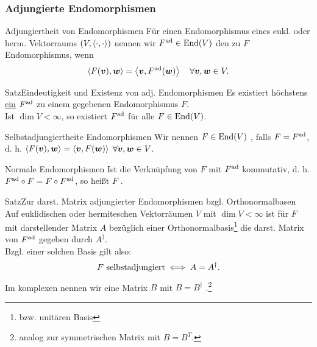\subsubsection{Adjungierte Endomorphismen}
\begin{Def}
{Adjungiertheit von Endomorphismen}
Für einen Endomorphismus eines eukl. oder herm. Vektorraums $(V,\left\langle\cdot,\cdot\right\rangle)$ nennen wir $F^{\text{ad}}\in \text{End}(V)$ den zu $F$  Endomorphismus, wenn
\begin{equation}
    \left\langle F({{\text{\boldmath${v}$}}}),{{\text{\boldmath${w}$}}}\right\rangle=\left\langle{{\text{\boldmath${v}$}}},F^{\text{ad}}({{\text{\boldmath${w}$}}})\right\rangle\quad\forall {{\text{\boldmath${v}$}}},{{\text{\boldmath${w}$}}}\in V.
\end{equation}
\end{Def}
\begin{Satz}
{Satz}{Eindeutigkeit und Existenz von adj. Endomorphismen}
Es existiert höchstens \underline{ein} $F^{\text{ad}}$ zu einem gegebenen Endomorphismus $F$.\\
Ist $\dim V<\infty$, so existiert $F^{\text{ad}}$ für alle $F\in\text{End}(V)$.
\end{Satz}
\begin{Def}
{Selbstadjungiertheite Endomorphismen}
Wir nennen $F\in\text{End}(V)$ , falls $F=F^{\text{ad}}$, d. h. $\left\langle F({{\text{\boldmath${v}$}}}),{{\text{\boldmath${w}$}}}\right\rangle=\left\langle{{\text{\boldmath${v}$}}},F({{\text{\boldmath${w}$}}})\right\rangle$ $\forall {{\text{\boldmath${v}$}}},{{\text{\boldmath${w}$}}}\in V$.
\end{Def}
\begin{Def}
{Normale Endomorphismen}
Ist die Verknüpfung von $F$ mit $F^{\text{ad}}$ kommutativ, d. h. $F^{\text{ad}}\circ F=F\circ F^{\text{ad}}$, so heißt $F$ .
\end{Def}
\begin{Satz}
{Satz}{Zur darst. Matrix adjungierter Endomorphismen bzgl. Orthonormalbasen}
Auf euklidischen oder hermiteschen Vektorräumen $V$ mit $\dim V<\infty$ ist für $F$ mit darstellender Matrix $A$ bezüglich einer Orthonormalbasis\footnote{bzw. unitären Basis} die darst. Matrix von $F^{\text{ad}}$ gegeben durch $A^\dagger$.\\
Bzgl. einer solchen Basis gilt also:
\begin{equation}
    F\text{ selbstadjungiert}\iff A=A^\dag.
\end{equation}
Im komplexen nennen wir eine Matrix $B$ mit $B=B^\dag$ .\footnote{analog zur symmetrischen Matrix mit $B=B^T$.}
\end{Satz}
